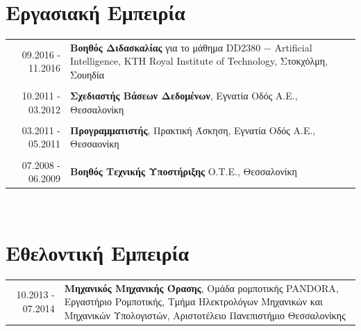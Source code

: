\documentclass[a4paper,10pt,twoside]{article}
\begin{document}

\section{Εργασιακή Εμπειρία}

\begin{tabular}{rp{12cm}}
09.2016 - 11.2016 & \textbf{Βοηθός Διδασκαλίας} για το μάθημα DD2380 $-$ Artificial Intelligence, KTH Royal Institute of Technology, Στοκχόλμη, Σουηδία\\
&\\
10.2011 - 03.2012 & \textbf{Σχεδιαστής Βάσεων Δεδομένων}, Εγνατία Οδός Α.Ε., Θεσσαλονίκη \\
&\\
03.2011 - 05.2011 & \textbf{Προγραμματιστής}, Πρακτική Άσκηση, Εγνατία Οδός Α.Ε., Θεσσαονίκη \\
&\\
07.2008 - 06.2009 & \textbf{Βοηθός Τεχνικής Υποστήριξης} Ο.Τ.Ε., Θεσσαλονίκη\\
\end{tabular} \\



\section{Εθελοντική Εμπειρία}

\begin{tabular}{rp{12cm}}
10.2013 - 07.2014 & \textbf{Μηχανικός Μηχανικής Όρασης}, Ομάδα ρομποτικής PANDORA, Εργαστήριο Ρομποτικής,
Τμήμα Ηλεκτρολόγων Μηχανικών και Μηχανικών Υπολογιστών, Αριστοτέλειο Πανεπιστήμιο Θεσσαλονίκης \\
\end{tabular} \\


\end{document}
